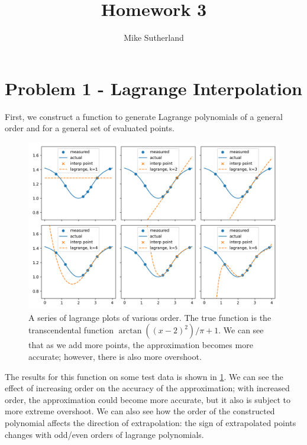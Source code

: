 \documentclass[10pt,letterpaper]{article}
\author{Mike Sutherland}
\title{Homework 3}
\begin{document}
    \maketitle
    
    \section{Problem 1 - Lagrange Interpolation}
    First, we construct a function to generate Lagrange polynomials of a general order and for a general set of evaluated points.
    \begin{figure}[h]
        \centering
        \includegraphics[width=1.0\linewidth]{../plots/lagrange.png}
        \caption{A series of lagrange plots of various order. The true function is the transcendental function $\arctan((x-2)^2)/\pi + 1$. We can see that as we add more points, the approximation becomes more accurate; however, there is also more overshoot.}
        \label{fig:lagrange}
    \end{figure}
    The results for this function on some test data is shown in \cref{fig:lagrange}. We can see the effect of increasing order on the accuracy of the approximation; with increased order, the approximation could become more accurate, but it also is subject to more extreme overshoot. We can also see how the order of the constructed polynomial affects the direction of extrapolation: the sign of extrapolated points changes with odd/even orders of lagrange polynomials.
\end{document}
